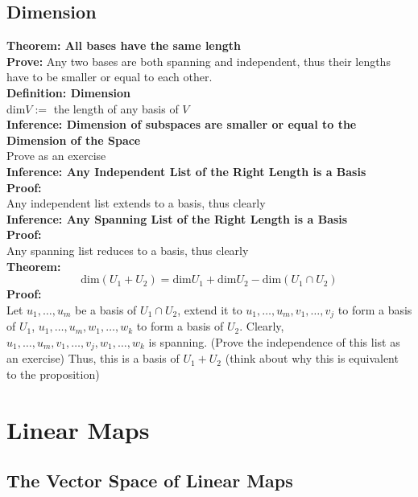 \documentclass{article}
\newcommand{\0}{{\bf{0}}}
\begin{document}
\subsection{Dimension}
\textbf{Theorem: All bases have the same length}\\
\textbf{Prove:} Any two bases are both spanning and independent, thus their lengths have to be smaller or equal to each other.\\
\textbf{Definition: Dimension}\\
dim$V:=$ the length of any basis of $V$\\
\textbf{Inference: Dimension of subspaces are smaller or equal to the Dimension of the Space}\\
\null\hfill{Prove as an exercise}\\
\textbf{Inference: Any Independent List of the Right Length is a Basis}\\
\textbf{Proof:}\\
Any independent list extends to a basis, thus clearly\\
\textbf{Inference: Any Spanning List of the Right Length is a Basis}\\
\textbf{Proof:}\\
Any spanning list reduces to a basis, thus clearly\\
\textbf{Theorem:}
$$\mbox{dim}(U_1+U_2)=\mbox{dim}U_1+\mbox{dim}U_2-\mbox{dim}(U_1\cap U_2)$$
\textbf{Proof:}\\
Let $u_1,\dots,u_m$ be a basis of $U_1\cap U_2$, extend it to $u_1,\dots,u_m,v_1,\dots,v_j$ to form a basis of $U_1$, $u_1,\dots,u_m,w_1,\dots,w_k$ to form a basis of $U_2$. Clearly, $u_1,\dots,u_m,v_1,\dots,v_j,w_1,\dots,w_k$ is spanning. (Prove the independence of this list as an exercise) Thus, this is a basis of $U_1+U_2$ (think about why this is equivalent to the proposition)
\clearpage
\section{Linear Maps}
\subsection{The Vector Space of Linear Maps}
\end{document}
